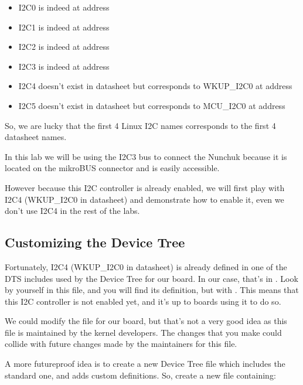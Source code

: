\begin{itemize}
\item I2C0 is indeed at address 
\item I2C1 is indeed at address 
\item I2C2 is indeed at address 
\item I2C3 is indeed at address 
\item I2C4 doesn't exist in datasheet but corresponds to
      WKUP\_I2C0 at address 
\item I2C5 doesn't exist in datasheet but corresponds to
      MCU\_I2C0 at address 
\end{itemize}

So, we are lucky that the first 4 Linux I2C names corresponds to the first 4
datasheet names.

In this lab we will be using the I2C3 bus to connect the Nunchuk
because it is located on the mikroBUS connector and is easily
accessible.

However because this I2C controller is already enabled, we will
first play with I2C4 (WKUP\_I2C0 in datasheet) and demonstrate
how to enable it, even we don't use I2C4 in the rest of the labs.

\subsection{Customizing the Device Tree}

Fortunately, I2C4 (WKUP\_I2C0 in datasheet) is already defined
in one of the DTS includes used by the Device Tree for our board.
In our case, that's in .
Look by yourself in this file, and you will find its definition, but with
. This means that this I2C controller is not
enabled yet, and it's up to boards using it to do so.

We could modify the  file
for our board, but that's not a very good idea as this file is
maintained by the kernel developers. The changes that you make could
collide with future changes made by the maintainers for this file.

A more futureproof idea is to create a new Device Tree file which
includes the standard one, and adds custom definitions. So, create a
new  file containing:

